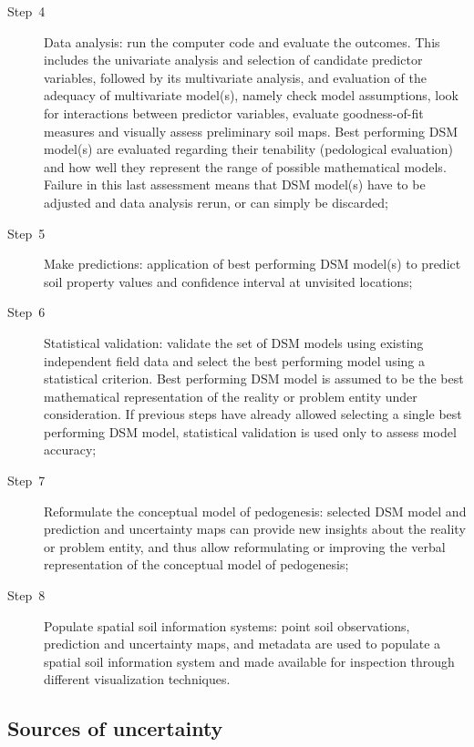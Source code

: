 \begin{description}
  \item [{Step~4}] Data analysis: run the computer code and evaluate the 
  outcomes. This includes the univariate analysis and selection of candidate 
  predictor variables, followed by its multivariate analysis, and evaluation of
  the adequacy of multivariate model(s), namely check model assumptions, look 
  for interactions between predictor variables, evaluate goodness-of-fit 
  measures and visually assess preliminary soil maps. Best performing DSM 
  model(s) are evaluated regarding their tenability (pedological evaluation) 
  and how well they represent the range of possible mathematical models. 
  Failure in this last assessment means that DSM model(s) have to be adjusted 
  and data analysis rerun, or can simply be discarded;

  \item [{Step~5}] Make predictions: application of best performing DSM model(s)
  to predict soil property values and confidence interval at unvisited locations;

  \item [{Step~6}] Statistical validation: validate the set of DSM models using
  existing independent field data and select the best performing model using a 
  statistical criterion. Best performing DSM model is assumed to be the best 
  mathematical representation of the reality or problem entity under 
  consideration. If previous steps have already allowed selecting a single best 
  performing DSM model, statistical validation is used only to assess model 
  accuracy;
  
  \item [{Step~7}] Reformulate the conceptual model of pedogenesis: selected 
  DSM model and prediction and uncertainty maps can provide new insights about 
  the reality or problem entity, and thus allow reformulating or improving the 
  verbal representation of the conceptual model of pedogenesis;
  
  \item [{Step~8}] Populate spatial soil information systems: point soil 
  observations, prediction and uncertainty maps, and metadata are used to 
  populate a spatial soil information system and made available for inspection 
  through different visualization techniques.
\end{description}

\subsection{Sources of uncertainty} %

